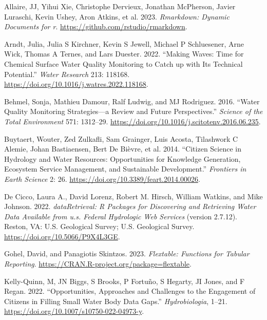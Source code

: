 \hypertarget{refs}{}
\begin{CSLReferences}{1}{0}
\leavevmode{}%
Allaire, JJ, Yihui Xie, Christophe Dervieux, Jonathan McPherson, Javier Luraschi, Kevin Ushey, Aron Atkins, et al. 2023. \emph{Rmarkdown: Dynamic Documents for r}. \url{https://github.com/rstudio/rmarkdown}.

\leavevmode{}%
Arndt, Julia, Julia S Kirchner, Kevin S Jewell, Michael P Schluesener, Arne Wick, Thomas A Ternes, and Lars Duester. 2022. {``Making Waves: Time for Chemical Surface Water Quality Monitoring to Catch up with Its Technical Potential.''} \emph{Water Research} 213: 118168. \url{https://doi.org/10.1016/j.watres.2022.118168}.

\leavevmode{}%
Behmel, Sonja, Mathieu Damour, Ralf Ludwig, and MJ Rodriguez. 2016. {``Water Quality Monitoring Strategies---a Review and Future Perspectives.''} \emph{Science of the Total Environment} 571: 1312--29. \url{https://doi.org/10.1016/j.scitotenv.2016.06.235}.

\leavevmode{}%
Buytaert, Wouter, Zed Zulkafli, Sam Grainger, Luis Acosta, Tilashwork C Alemie, Johan Bastiaensen, Bert De Bièvre, et al. 2014. {``Citizen Science in Hydrology and Water Resources: Opportunities for Knowledge Generation, Ecosystem Service Management, and Sustainable Development.''} \emph{Frontiers in Earth Science} 2: 26. \url{https://doi.org/10.3389/feart.2014.00026}.

\leavevmode{}%
De Cicco, Laura A., David Lorenz, Robert M. Hirsch, William Watkins, and Mike Johnson. 2022. \emph{dataRetrieval: R Packages for Discovering and Retrieving Water Data Available from u.s. Federal Hydrologic Web Services} (version 2.7.12). Reston, VA: U.S. Geological Survey; U.S. Geological Survey. \url{https://doi.org/10.5066/P9X4L3GE}.

\leavevmode{}%
Gohel, David, and Panagiotis Skintzos. 2023. \emph{Flextable: Functions for Tabular Reporting}. \url{https://CRAN.R-project.org/package=flextable}.

\leavevmode{}%
Kelly-Quinn, M, JN Biggs, S Brooks, P Fortuño, S Hegarty, JI Jones, and F Regan. 2022. {``Opportunities, Approaches and Challenges to the Engagement of Citizens in Filling Small Water Body Data Gaps.''} \emph{Hydrobiologia}, 1--21. \url{https://doi.org/10.1007/s10750-022-04973-y}.


\end{CSLReferences}
